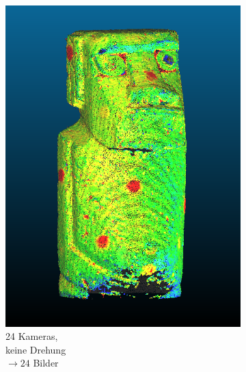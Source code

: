 \documentclass[./00PhotoBox.tex]{subfiles}
\begin{document}
\begin{figure}
    \centering
    \begin{subfigure}{0.30\textwidth}
        \includegraphics[width=1\linewidth]{img/7_versuche/cam_anzahl/normal.png}
        \centering
        \caption{
            24 Kameras,\\
            keine Drehung\\
            $\rightarrow 24$ Bilder
        }
        \label{img:moai_normal}
    \end{subfigure}
    \begin{subfigure}{0.30\textwidth}

\end{subfigure}
\end{figure}
\end{document}
